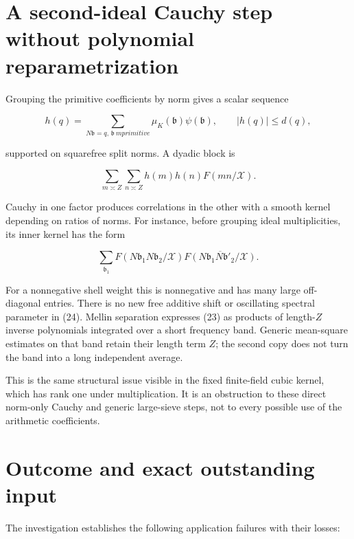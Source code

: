 \section{A second-ideal Cauchy step without polynomial
reparametrization}\label{a-second-ideal-cauchy-step-without-polynomial-reparametrization}

Grouping the primitive coefficients by norm gives a scalar sequence

\[
h(q)=\sum_{N\mathfrak b=q,\,\mathfrak b\ {
m primitive}}
\mu_K(\mathfrak b)\psi(\mathfrak b),\qquad |h(q)|\le d(q),
\]

supported on squarefree split norms. A dyadic block is

\[
\sum_{m\asymp Z}\sum_{n\asymp Z}h(m)h(n)F(mn/\mathcal X).
\tag{23}
\]

Cauchy in one factor produces correlations in the other with a smooth
kernel depending on ratios of norms. For instance, before grouping ideal
multiplicities, its inner kernel has the form

\[
\sum_{\mathfrak b_1}
F(N\mathfrak b_1N\mathfrak b_2/\mathcal X)
\overline{F(N\mathfrak b_1N\mathfrak b'_2/\mathcal X)}.
\tag{24}
\]

For a nonnegative shell weight this is nonnegative and has many large
off-diagonal entries. There is no new free additive shift or oscillating
spectral parameter in (24). Mellin separation expresses (23) as products
of length-\(Z\) inverse polynomials integrated over a short frequency
band. Generic mean-square estimates on that band retain their length
term \(Z\); the second copy does not turn the band into a long
independent average.

This is the same structural issue visible in the fixed finite-field
cubic kernel, which has rank one under multiplication. It is an
obstruction to these direct norm-only Cauchy and generic large-sieve
steps, not to every possible use of the arithmetic coefficients.

\section{Outcome and exact outstanding
input}\label{outcome-and-exact-outstanding-input}

The investigation establishes the following application failures with
their losses:

